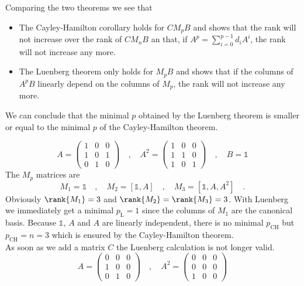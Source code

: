 Comparing the two theorems we see that 
\begin{itemize}
\item The Cayley-Hamilton corollary holds for $C M_p B$ and shows that the rank will not 
increase over the rank of $C M_n B$ an that, if $A^p = \sum_{i=0}^{p-1} d_iA^i$, the rank 
will not increase any more. 
\item The Luenberg theorem only holds for $M_p B$ and shows that if the columns of $A^p B$ 
linearly depend on the columns of $M_p$, the rank will not increase any more.
\end{itemize}
We can conclude that the minimal $p$ obtained by the Luenberg theorem is smaller or equal 
to the minimal $p$ of the Cayley-Hamilton theorem.

\begin{example}
\begin{equation}
A = \begin{pmatrix}
1 & 0 & 0 \\ 1 & 0 & 1 \\ 0 & 1 & 0
\end{pmatrix} 
\quad , \quad
A^2 = \begin{pmatrix}
1 & 0 & 0 \\ 1 & 1 & 0 \\ 1 & 0 & 1
\end{pmatrix}
\quad , \quad 
B = \mathbb{1}
\end{equation}
The $M_p$ matrices are
\begin{equation}
M_1 = \mathbb{1} \quad , \quad  M_2 = [\mathbb{1}, A] \quad , 
\quad  M_3 = [\mathbb{1}, A , A^2] \quad .
\end{equation}
Obviously $\rank{M_1} = 3$ and $\rank{M_2}=\rank{M_3}=3$. With Luenberg we immediately get 
a minimal $p_\text{L} = 1$ since the columns of $M_1$ are the canonical basis. Because 
$\mathbb{1}$, $A$ and $A$ are linearly independent, there is no minimal 
$p_\text{CH}$ but $p_\text{CH}=n=3$ which is ensured by the Cayley-Hamilton theorem. 
\\
As soon as we add a matrix $C$ the Luenberg calculation is not longer valid. 
\begin{equation}
A = \begin{pmatrix}
0&0&0\\1&0&0\\0&1&0
\end{pmatrix}
\quad , \quad
A^2 = \begin{pmatrix}
0&0&0\\0&0&0\\1&0&0

\end{pmatrix}
\end{equation}
\end{example}
